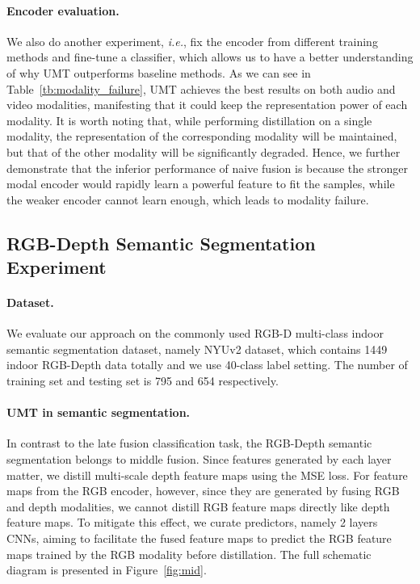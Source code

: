 \paragraph{Encoder evaluation.}
We also do another experiment, \textit{i.e.}, fix the encoder from different training methods and fine-tune a classifier, which allows us to have a better understanding of why UMT outperforms baseline methods. As we can see in  Table~\ref{tb:modality_failure}, UMT achieves the best results on both audio and video modalities, manifesting that it could keep the representation power of each modality. It is worth noting that, while performing distillation on a single modality, the representation of the corresponding modality will be maintained, but that of the other modality will be significantly degraded. Hence, we further demonstrate that the inferior performance of naive fusion is because the stronger modal encoder would rapidly learn a powerful feature to fit the samples, while the weaker encoder cannot learn enough, which leads to modality failure.


\subsection{RGB-Depth Semantic Segmentation Experiment}
\label{sec:rgbd}
\paragraph{Dataset.} We evaluate our approach on the commonly used RGB-D multi-class indoor semantic segmentation dataset, namely NYUv2 dataset, which contains 1449 indoor RGB-Depth data totally and we use 40-class label setting. The number of training set and testing set is 795 and 654 respectively. 

\paragraph{UMT in semantic segmentation.} In contrast to the late fusion classification task, the RGB-Depth semantic segmentation belongs to middle fusion. Since features generated by each layer matter, we distill multi-scale depth feature maps using the MSE loss. For feature maps from the RGB encoder, however, since they are generated by fusing RGB and depth modalities, we cannot distill RGB feature maps directly like depth feature maps. To mitigate this effect, we curate predictors, namely 2 layers CNNs, aiming to facilitate the fused feature maps to predict the RGB feature maps trained by the RGB modality before distillation. The full schematic diagram is presented in Figure~\ref{fig:mid}.
